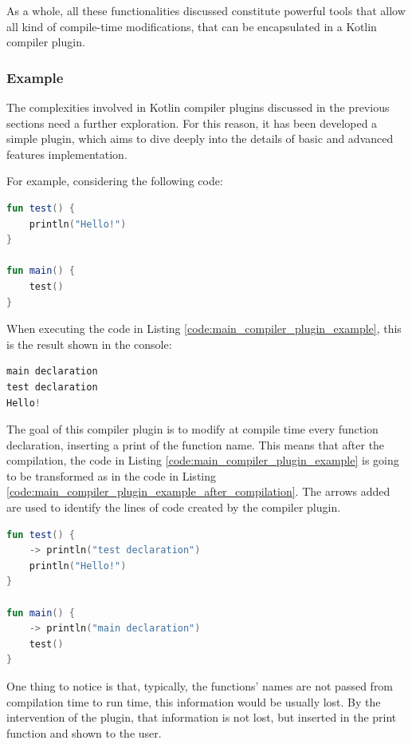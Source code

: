 As a whole, all these functionalities discussed constitute powerful tools that allow all kind of compile-time modifications, that can be encapsulated in a Kotlin compiler plugin.

\subsubsection{Example}\label{section:compiler_plugin_example}
The complexities involved in Kotlin compiler plugins discussed in the previous sections need a further exploration. For this reason, it has been developed a simple plugin, which aims to dive deeply into the details of basic and advanced features implementation.

For example, considering the following code:
\begin{lstlisting}[caption={Kotlin code without the modification of the compiler plugin created as an example}, captionpos=b, language=Kotlin, label={code:main_compiler_plugin_example}]
fun test() {
    println("Hello!")
}
    
fun main() {
    test()
}
\end{lstlisting}
When executing the code in Listing \ref{code:main_compiler_plugin_example}, this is the result shown in the console:
\begin{lstlisting}[caption={Output of the execution of Listing \ref{code:main_compiler_plugin_example} with the application of the compiler plugin created as an example}, captionpos=b, language=Kotlin, label={code:output_main_compiler_plugin_example}]
main declaration
test declaration
Hello!
\end{lstlisting}
The goal of this compiler plugin is to modify at compile time every function declaration, inserting a print of the function name. This means that after the compilation, the code in Listing \ref{code:main_compiler_plugin_example} is going to be transformed as in the code in Listing \ref{code:main_compiler_plugin_example_after_compilation}. The arrows added are used to identify the lines of code created by the compiler plugin.
\begin{lstlisting}[caption={Kotlin code with the modification of the compiler plugin created as an example}, captionpos=b, language=Kotlin, escapechar=\$, label={code:main_compiler_plugin_example_after_compilation}]
fun test() {
    -> println("test declaration")
    println("Hello!")
}

fun main() {
    -> println("main declaration")
    test()
}
\end{lstlisting}
One thing to notice is that, typically, the functions' names are not passed from compilation time to run time, this information would be usually lost. By the intervention of the plugin, that information is not lost, but inserted in the print function and shown to the user.

